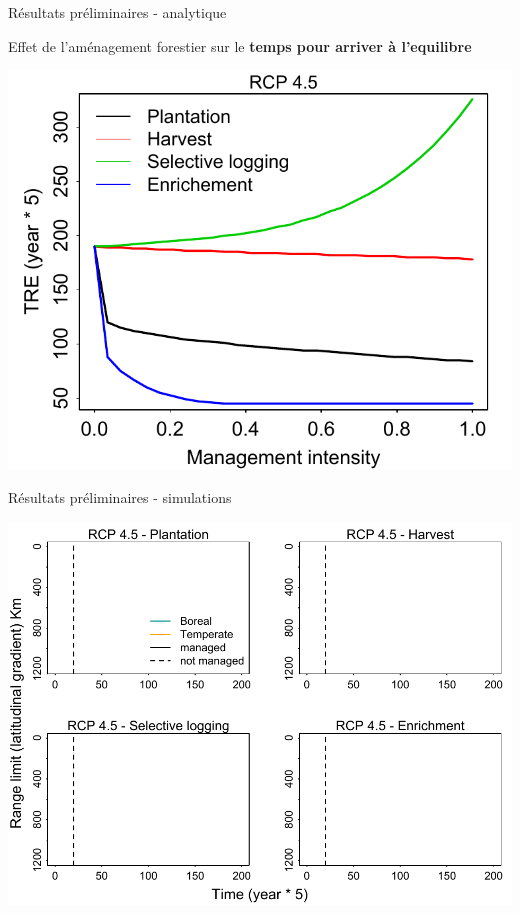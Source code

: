 \documentclass[11pt, compress, aspectratio=1610]{beamer}
\begin{document}
\begin{frame}{Résultats préliminaires - analytique}
\protect\hypertarget{ruxe9sultats-pruxe9liminaires---analytique}{}

Effet de l’aménagement forestier sur le \textbf{temps pour arriver à
l’equilibre}

\centering

\includegraphics[scale=0.55]{figures/resultTRE.pdf}

\par

\end{frame}

\begin{frame}{Résultats préliminaires - simulations}
\protect\hypertarget{ruxe9sultats-pruxe9liminaires---simulations}{}

\vspace*{-6mm}
\centering

\includegraphics[scale=0.65]{figures/resultSim0.pdf}

\par

\end{frame}
\end{document}
